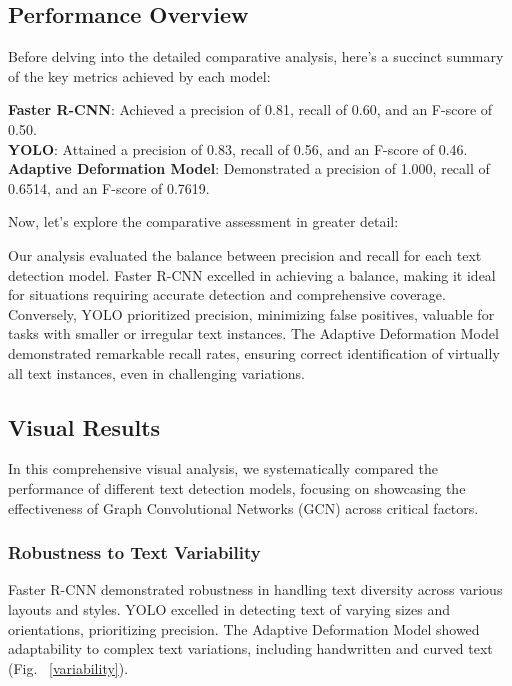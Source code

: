 \documentclass[default,iicol]{sn-jnl}%
\begin{document}
\subsection{Performance Overview}

Before delving into the detailed comparative analysis, here's a succinct summary of the key metrics achieved by each model:

\textbf{Faster R-CNN}: Achieved a precision of 0.81, recall of 0.60, and an F-score of 0.50. \\
\textbf{YOLO}: Attained a precision of 0.83, recall of 0.56, and an F-score of 0.46. \\
\textbf{Adaptive Deformation Model}: Demonstrated a precision of 1.000, recall of 0.6514, and an F-score of 0.7619.

Now, let's explore the comparative assessment in greater detail:

Our analysis evaluated the balance between precision and recall for each text detection model. Faster R-CNN excelled in achieving a balance, making it ideal for situations requiring accurate detection and comprehensive coverage. Conversely, YOLO prioritized precision, minimizing false positives, valuable for tasks with smaller or irregular text instances. The Adaptive Deformation Model demonstrated remarkable recall rates, ensuring correct identification of virtually all text instances, even in challenging variations.

\subsection{Visual Results}
In this comprehensive visual analysis, we systematically compared the performance of different text detection models, focusing on showcasing the effectiveness of Graph Convolutional Networks (GCN) across critical factors.

\subsubsection*{Robustness to Text Variability} 
Faster R-CNN demonstrated robustness in handling text diversity across various layouts and styles. YOLO excelled in detecting text of varying sizes and orientations, prioritizing precision. The Adaptive Deformation Model showed adaptability to complex text variations, including handwritten and curved text (Fig. ~\ref{variability}).
\end{document}
